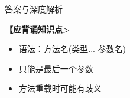 \documentclass[12pt, a4paper]{ctexart}
\begin{document}
\begin{enumerate}[label=\textbf{\arabic*.}]
\begin{bluebox}{答案与深度解析}
\begin{itemize}[label={}, leftmargin=*, nosep]
		      \textbf{【应背诵知识点>}
		      \begin{itemize}[label={}, nosep]
			      \item 语法：方法名(类型... 参数名)
			      \item 只能是最后一个参数
			      \item 方法重载时可能有歧义
		      \end{itemize}
		      \end{itemize}
	      \end{bluebox}

\end{enumerate}
\end{document}
